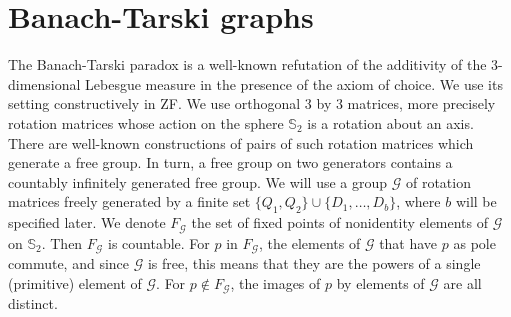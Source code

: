 \documentclass{lmcs}
\begin{document}
\section{Banach-Tarski graphs} \label{banach}
The Banach-Tarski paradox is a well-known refutation of the additivity of the $3$-dimensional Lebesgue measure 
in the presence of the axiom of choice. We use its setting constructively in ZF. 
We use orthogonal $3$ by $3$ matrices, more precisely rotation matrices whose action on the sphere $\mathbb{S}_2$ is a rotation
about an axis. There are well-known constructions of pairs
of such rotation matrices which generate a free group.
In turn, a free group on two generators contains a countably infinitely generated free group. 
We will use a group $\mathcal{G}$ of rotation matrices freely generated by a finite set $\{Q_1, Q_2\} \cup \{D_1, \ldots, D_b\}$,
where $b$ will be specified later. We denote $F_{\mathcal{G}}$ the set of fixed points of nonidentity elements of $\mathcal{G}$
on $\mathbb{S}_2$. Then $F_{\mathcal{G}}$ is countable.
For $p$ in $F_{\mathcal{G}}$, the elements of $\mathcal{G}$ that have $p$ as pole commute, and since $\mathcal{G}$ 
is free, this means that they are the powers of a single 
(primitive) element of $\mathcal{G}$. For $p \not \in F_{\mathcal{G}}$, the images of 
$p$ by elements of $\mathcal{G}$ are all distinct. 
\end{document}
